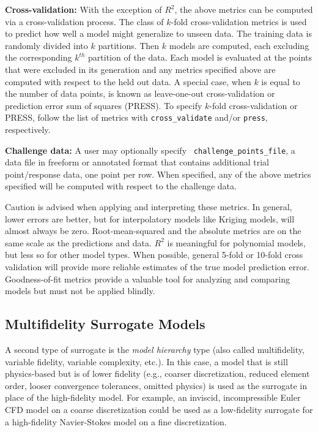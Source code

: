 {\bf Cross-validation:} With the exception of $R^2$, the above metrics
can be computed via a cross-validation process.  The class of $k$-fold
cross-validation metrics is used to predict how well a model might
generalize to unseen data.  The training data is randomly divided into
$k$ partitions.  Then $k$ models are computed, each excluding the
corresponding $k^{th}$ partition of the data.  Each model is evaluated
at the points that were excluded in its generation and any metrics
specified above are computed with respect to the held out data.  A
special case, when $k$ is equal to the number of data points, is known
as leave-one-out cross-validation or prediction error sum of squares
(PRESS).  To specify $k$-fold cross-validation or PRESS, follow the
list of metrics with {\tt cross\_validate} and/or {\tt press},
respectively.

{\bf Challenge data:} A user may optionally specify {\tt
  challenge\_points\_file}, a data file in freeform or annotated
format that contains additional trial point/response data, one point
per row.  When specified, any of the above metrics specified will be
computed with respect to the challenge data.

Caution is advised when applying and interpreting these metrics.  In
general, lower errors are better, but for interpolatory models like
Kriging models, will almost always be zero.  Root-mean-squared and the
absolute metrics are on the same scale as the predictions and data.
$R^2$ is meaningful for polynomial models, but less so for other model
types.  When possible, general 5-fold or 10-fold cross validation will
provide more reliable estimates of the true model prediction
error. Goodness-of-fit metrics provide a valuable tool for analyzing
and comparing models but must not be applied blindly.


\subsection{Multifidelity Surrogate Models} \label{models:surrogate:multifid}

A second type of surrogate is the {\em model hierarchy} type (also
called multifidelity, variable fidelity, variable complexity, etc.).
In this case, a model that is still physics-based but is of lower
fidelity (e.g., coarser discretization, reduced element order, looser
convergence tolerances, omitted physics) is used as the surrogate in
place of the high-fidelity model.  For example, an inviscid,
incompressible Euler CFD model on a coarse discretization could be
used as a low-fidelity surrogate for a high-fidelity Navier-Stokes
model on a fine discretization.

